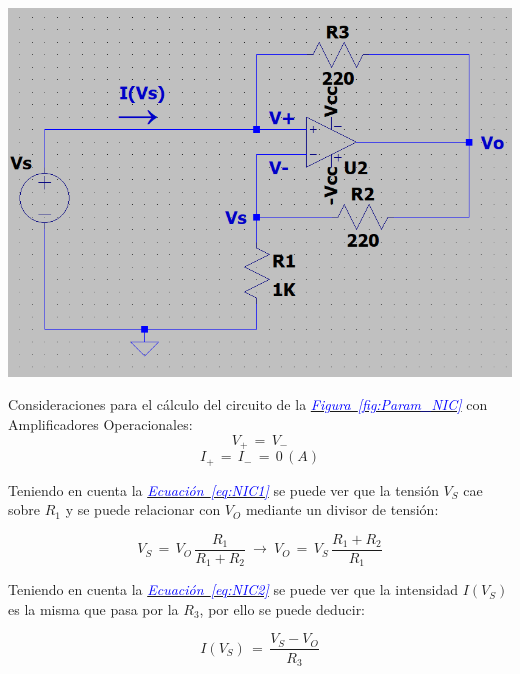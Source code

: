 \documentclass[12pt,a4paper]{report} %
\newcommand{\figureref}[1]{\hyperref[#1]{\textcolor{blue}{\textit{Figura~\ref*{#1}}}}}
\newcommand{\equationref}[1]{\hyperref[#1]{\textcolor{blue}{\textit{Ecuación~\ref*{#1}}}}}
\begin{document}
	\begin{center}
	\begin{multicols}{2}
		\centering
		\includegraphics[width=\columnwidth]{demotracion_NIC.png}
		\label{fig:Param_NIC}
	
		\columnbreak
		
		Consideraciones para el cálculo del circuito de la \figureref{fig:Param_NIC} con Amplificadores Operacionales:\\
		\begin{equation}
			V_+\,=\,V_-
			\label{eq:NIC1}
		\end{equation}
		\begin{equation}
			I_+\,=\,I_-\,=\,0\,(A)
			\label{eq:NIC2}
		\end{equation}
	\end{multicols}
	\end{center}
	
	Teniendo en cuenta la \equationref{eq:NIC1} se puede ver que la tensión $V_S$ cae sobre $R_1$ y se puede relacionar con $V_O$ mediante un divisor de tensión:
	
	\begin{equation}
		V_S\,=\,V_O\,\frac{R_1}{R_1 + R_2}\:\longrightarrow\:V_O\,=\,V_S\,\frac{R_1 + R_2}{R_1}
		\label{eq:NIC3}
	\end{equation}\smallskip
	
	Teniendo en cuenta la \equationref{eq:NIC2} se puede ver que la intensidad $I(V_S)$ es la misma que pasa por la $R_3$, por ello se puede deducir:
	
	\begin{equation}
		I(V_S)\,=\,\frac{V_S - V_O}{R_3}
		\label{eq:NIC4}
	\end{equation}\smallskip
	
\end{document}
